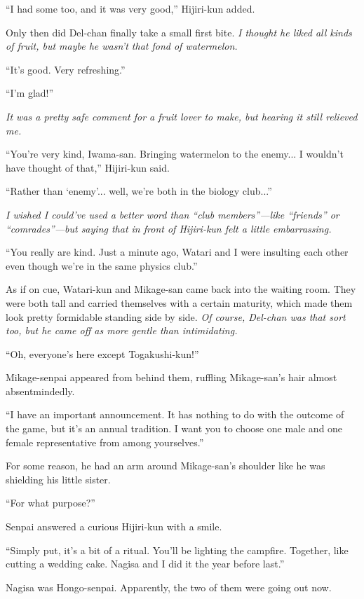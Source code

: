 \documentclass[
    a4paper,
    12pt,
    twoside,
    openany,
    UTF8,
    fontset=windows
]{ctexbook}
\begin{document}
``I had some too, and it was very good,'' Hijiri-kun added.

Only then did Del-chan finally take a small first bite. \textit{I thought he liked all kinds of fruit, but maybe he wasn't that fond of watermelon.}

``It's good. Very refreshing.''

``I'm glad!''

\textit{It was a pretty safe comment for a fruit lover to make, but hearing it still relieved me.}

``You're very kind, Iwama-san. Bringing watermelon to the enemy... I wouldn't have thought of that,'' Hijiri-kun said.

``Rather than `enemy'... well, we're both in the biology club...''

\textit{I wished I could've used a better word than ``club members''---like ``friends'' or ``comrades''---but saying that in front of Hijiri-kun felt a little embarrassing.}

``You really are kind. Just a minute ago, Watari and I were insulting each other even though we're in the same physics club.''

As if on cue, Watari-kun and Mikage-san came back into the waiting room. They were both tall and carried themselves with a certain maturity, which made them look pretty formidable standing side by side. \textit{Of course, Del-chan was that sort too, but he came off as more gentle than intimidating.}

``Oh, everyone's here except Togakushi-kun!''

Mikage-senpai appeared from behind them, ruffling Mikage-san's hair almost absentmindedly.

``I have an important announcement. It has nothing to do with the outcome of the game, but it's an annual tradition. I want you to choose one male and one female representative from among yourselves.''

For some reason, he had an arm around Mikage-san's shoulder like he was shielding his little sister.

``For what purpose?''

Senpai answered a curious Hijiri-kun with a smile.

``Simply put, it's a bit of a ritual. You'll be lighting the campfire. Together, like cutting a wedding cake. Nagisa and I did it the year before last.''

Nagisa was Hongo-senpai. Apparently, the two of them were going out now.
\end{document}
